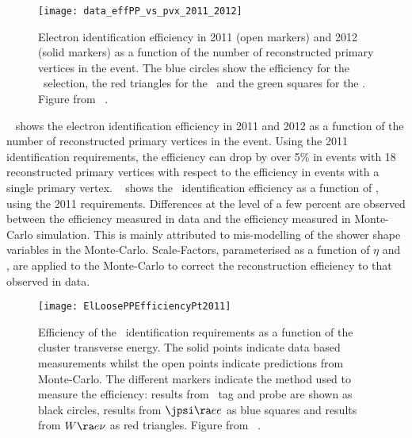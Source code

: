 \begin{figure}[h]
\centering
            \texttt{[image: data\_effPP\_vs\_pvx\_2011\_2012]}
\caption[Electron identification efficiency in 2011 and 2012
 as a function of the number of reconstructed primary vertices in
the event.]{Electron identification efficiency in 2011 (open markers) and 2012
(solid markers) as a function of the number of reconstructed primary vertices in
the event. The blue circles show the efficiency for the \loosePP\ selection, the
red triangles for the \mediumPP\ and the green squares for the \tightPP. 
Figure
from
~\cite{EfficiencyPileup}.
}
\label{fig:el-id-eff-npv}
\end{figure}

~ shows the electron identification efficiency in 2011 and 2012
as a function of the number of reconstructed primary vertices in the event.
Using the 2011 identification requirements, the efficiency can drop by over 5\%
in events with 18 reconstructed primary vertices with respect to the efficiency
in events with a single primary vertex.
~ shows the \loosePP\ identification efficiency as a function
of \et, using the 2011 requirements. Differences at the level of a
few percent are observed between the efficiency measured in data and the
efficiency measured in Monte-Carlo simulation. This is mainly attributed to mis-modelling
of the shower shape variables in the Monte-Carlo.
Scale-Factors, parameterised as a function of $\eta$ and \et, are applied to
the Monte-Carlo to correct the reconstruction efficiency to that observed in
data.


\begin{figure}[h]
\centering
            \texttt{[image: ElLoosePPEfficiencyPt2011]}
\caption[Efficiency of
the \loosePP\ identification requirements as a function of the cluster transverse
energy.]{
Efficiency of
the \loosePP\ identification requirements as a function of the cluster transverse
energy. The solid points indicate data based measurements whilst the open points
indicate predictions from Monte-Carlo. The different markers indicate the method used to
measure the efficiency: results from \Zee\ tag and probe are shown as black
circles, results from $\jpsi \ra ee$ as blue squares and results from $W \ra e
\nu$ as red triangles.
Figure
from
~\cite{ElectronEfficiency2011}.
}
\label{fig:el-id-eff-et}
\end{figure}


